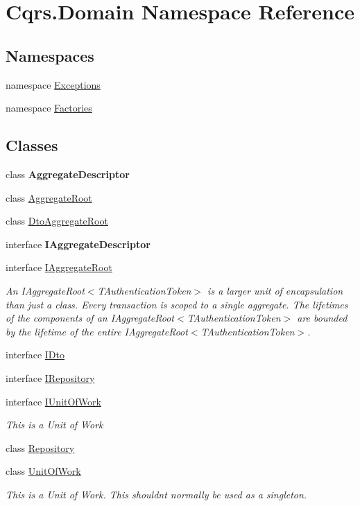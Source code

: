 \hypertarget{namespaceCqrs_1_1Domain}{}\section{Cqrs.\+Domain Namespace Reference}
\label{namespaceCqrs_1_1Domain}
\subsection*{Namespaces}
\begin{DoxyCompactItemize}
\item 
namespace \hyperlink{namespaceCqrs_1_1Domain_1_1Exceptions}{Exceptions}
\item 
namespace \hyperlink{namespaceCqrs_1_1Domain_1_1Factories}{Factories}
\end{DoxyCompactItemize}
\subsection*{Classes}
\begin{DoxyCompactItemize}
\item 
class {\bfseries Aggregate\+Descriptor}
\item 
class \hyperlink{classCqrs_1_1Domain_1_1AggregateRoot}{Aggregate\+Root}
\item 
class \hyperlink{classCqrs_1_1Domain_1_1DtoAggregateRoot}{Dto\+Aggregate\+Root}
\item 
interface {\bfseries I\+Aggregate\+Descriptor}
\item 
interface \hyperlink{interfaceCqrs_1_1Domain_1_1IAggregateRoot}{I\+Aggregate\+Root}
\begin{DoxyCompactList}\small\item\em An I\+Aggregate\+Root$<$\+T\+Authentication\+Token$>$ is a larger unit of encapsulation than just a class. Every transaction is scoped to a single aggregate. The lifetimes of the components of an I\+Aggregate\+Root$<$\+T\+Authentication\+Token$>$ are bounded by the lifetime of the entire I\+Aggregate\+Root$<$\+T\+Authentication\+Token$>$. \end{DoxyCompactList}\item 
interface \hyperlink{interfaceCqrs_1_1Domain_1_1IDto}{I\+Dto}
\item 
interface \hyperlink{interfaceCqrs_1_1Domain_1_1IRepository}{I\+Repository}
\item 
interface \hyperlink{interfaceCqrs_1_1Domain_1_1IUnitOfWork}{I\+Unit\+Of\+Work}
\begin{DoxyCompactList}\small\item\em This is a Unit of Work \end{DoxyCompactList}\item 
class \hyperlink{classCqrs_1_1Domain_1_1Repository}{Repository}
\item 
class \hyperlink{classCqrs_1_1Domain_1_1UnitOfWork}{Unit\+Of\+Work}
\begin{DoxyCompactList}\small\item\em This is a Unit of Work. This shouldn\textquotesingle{}t normally be used as a singleton. \end{DoxyCompactList}\end{DoxyCompactItemize}
